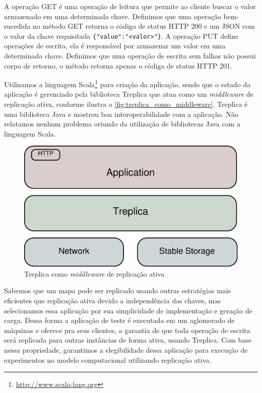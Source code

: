A operação GET é uma operação de leitura que permite ao cliente buscar o valor armazenado
em uma determinada chave. Definimos que uma operação bem-sucedida no método GET retorna o
código de status HTTP 200 e um JSON com o valor da chave requisitada
\verb|{"value":"<valor>"}|. A operação PUT define operações de escrita, ela é responsável
por armazenar um valor em uma determinada chave. Definimos que uma operação de escrita sem
falhas não possui corpo de retorno, o método retorna apenas o código de status HTTP 201.

Utilizamos a linguagem Scala\footnote{\url{http://www.scala-lang.org}} para criação da
aplicação, sendo que o estado da aplicação é gerenciado pela biblioteca Treplica que atua
como um \emph{middleware} de replicação ativa, conforme ilustra a
\autoref{fig:treplica_como_middleware}. Treplica é uma biblioteca Java e mostrou boa
interoperabilidade com a aplicação. Não relatamos nenhum problema oriundo da utilização de
bibliotecas Java com a linguagem Scala.

\begin{figure}[ht]
  \centering
  \includegraphics[width=12cm]{conteudo/capitulos/figuras/block-treplica.eps}
  \caption{Treplica como \emph{middleware} de replicação ativa}
  \label{fig:treplica_como_middleware}
\end{figure}

Sabemos que um mapa pode ser replicado usando outras estratégias mais eficientes que
replicação ativa devido a independência das chaves, mas selecionamos essa aplicação por
sua simplicidade de implementação e geração de carga. Dessa forma a aplicação de teste é
executada em um aglomerado de máquinas e oferece pra seus clientes, a garantia de que toda
operação de escrita será replicada para outras instâncias de forma ativa, usando Treplica.
Com base nessa propriedade, garantimos a elegibilidade dessa aplicação para execução de
experimentos no modelo computacional utilizando replicação ativa.

